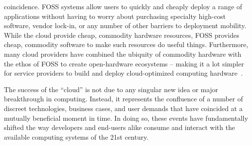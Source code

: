 \begin{packed_desc}
  coincidence. FOSS systems allow users to quickly and cheaply deploy
  a range of applications without having to worry about purchasing
  specialty high-cost software, vendor lock-in, or any number of other
  barriers to deployment mobility. While the cloud provide cheap,
  commodity hardware resources, FOSS provides cheap, commodity
  software to make such resources do useful things. Furthermore, many
  cloud providers have combined the ubiquity of commodity hardware
  with the ethos of FOSS to create open-hardware ecosystems -- making
  it a lot simpler for service providers to build and deploy
  cloud-optimized computing hardware~\cite{opencompute}.
\end{packed_desc}

The success of the ``cloud'' is not due to any singular new idea or
major breakthrough in computing. Instead, it represents the confluence
of a number of discreet technologies, business cases, and user demands
that have coincided at a mutually beneficial moment in time. In doing
so, these events have fundamentally shifted the way developers and
end-users alike consume and interact with the available computing
systems of the 21st century.

